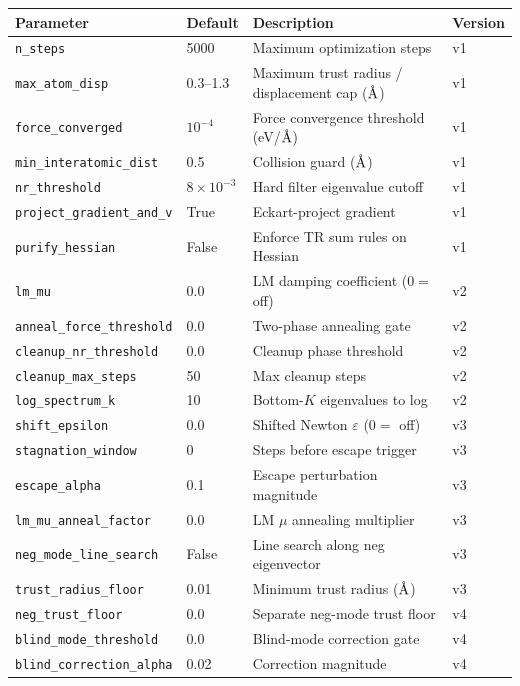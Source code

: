\documentclass[11pt,a4paper]{article}
\newcommand{\angstrom}{\text{\r{A}}}
\begin{document}
\begin{longtable}{llp{7cm}l}
\toprule
Parameter & Default & Description & Version \\
\midrule
\endfirsthead
\texttt{n\_steps} & 5000 & Maximum optimization steps & v1 \\
\texttt{max\_atom\_disp} & 0.3--1.3 & Maximum trust radius / displacement cap ($\angstrom$) & v1 \\
\texttt{force\_converged} & $10^{-4}$ & Force convergence threshold (eV/$\angstrom$) & v1 \\
\texttt{min\_interatomic\_dist} & 0.5 & Collision guard ($\angstrom$) & v1 \\
\texttt{nr\_threshold} & $8\times10^{-3}$ & Hard filter eigenvalue cutoff & v1 \\
\texttt{project\_gradient\_and\_v} & True & Eckart-project gradient & v1 \\
\texttt{purify\_hessian} & False & Enforce TR sum rules on Hessian & v1 \\
\midrule
\texttt{lm\_mu} & 0.0 & LM damping coefficient ($0 =$ off) & v2 \\
\texttt{anneal\_force\_threshold} & 0.0 & Two-phase annealing gate & v2 \\
\texttt{cleanup\_nr\_threshold} & 0.0 & Cleanup phase threshold & v2 \\
\texttt{cleanup\_max\_steps} & 50 & Max cleanup steps & v2 \\
\texttt{log\_spectrum\_k} & 10 & Bottom-$K$ eigenvalues to log & v2 \\
\midrule
\texttt{shift\_epsilon} & 0.0 & Shifted Newton $\varepsilon$ ($0 =$ off) & v3 \\
\texttt{stagnation\_window} & 0 & Steps before escape trigger & v3 \\
\texttt{escape\_alpha} & 0.1 & Escape perturbation magnitude & v3 \\
\texttt{lm\_mu\_anneal\_factor} & 0.0 & LM $\mu$ annealing multiplier & v3 \\
\texttt{neg\_mode\_line\_search} & False & Line search along neg eigenvector & v3 \\
\texttt{trust\_radius\_floor} & 0.01 & Minimum trust radius ($\angstrom$) & v3 \\
\midrule
\texttt{neg\_trust\_floor} & 0.0 & Separate neg-mode trust floor & v4 \\
\texttt{blind\_mode\_threshold} & 0.0 & Blind-mode correction gate & v4 \\
\texttt{blind\_correction\_alpha} & 0.02 & Correction magnitude & v4 \\

\end{longtable}
\end{document}
